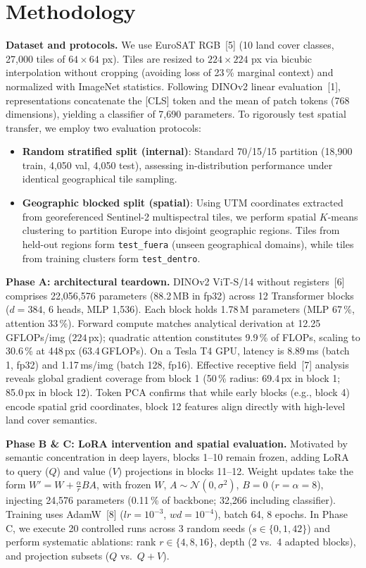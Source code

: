 \documentclass[10pt,a4paper]{article}
\newcommand{\para}[1]{\textbf{#1}\enspace}
\begin{document}
\section{Methodology}
\para{Dataset and protocols.} We use EuroSAT RGB~[5] (10 land cover classes, 27,000 tiles of $64\times64$ px). Tiles are resized to $224\times224$ px via bicubic interpolation without cropping (avoiding loss of 23\,\% marginal context) and normalized with ImageNet statistics. Following DINOv2 linear evaluation~[1], representations concatenate the [CLS] token and the mean of patch tokens (768 dimensions), yielding a classifier of 7,690 parameters.
To rigorously test spatial transfer, we employ two evaluation protocols:
\begin{itemize}\setlength{\itemsep}{0pt}\setlength{\parskip}{0pt}\setlength{\leftskip}{-1.2em}
\item \textbf{Random stratified split (internal)}: Standard 70/15/15 partition (18,900 train, 4,050 val, 4,050 test), assessing in-distribution performance under identical geographical tile sampling.
\item \textbf{Geographic blocked split (spatial)}: Using UTM coordinates extracted from georeferenced Sentinel-2 multispectral tiles, we perform spatial $K$-means clustering to partition Europe into disjoint geographic regions. Tiles from held-out regions form \texttt{test\_fuera} (unseen geographical domains), while tiles from training clusters form \texttt{test\_dentro}.
\end{itemize}

\para{Phase A: architectural teardown.} DINOv2 ViT-S/14 without registers~[6] comprises 22,056,576 parameters (88.2\,MB in fp32) across 12 Transformer blocks ($d=384$, 6 heads, MLP 1,536). Each block holds 1.78\,M parameters (MLP 67\,\%, attention 33\,\%). Forward compute matches analytical derivation at 12.25\,GFLOPs/img ($224$\,px); quadratic attention constitutes 9.9\,\% of FLOPs, scaling to 30.6\,\% at 448\,px (63.4\,GFLOPs). On a Tesla T4 GPU, latency is 8.89\,ms (batch 1, fp32) and 1.17\,ms/img (batch 128, fp16). Effective receptive field~[7] analysis reveals global gradient coverage from block 1 (50\,\% radius: 69.4\,px in block 1; 85.0\,px in block 12). Token PCA confirms that while early blocks (e.g., block 4) encode spatial grid coordinates, block 12 features align directly with high-level land cover semantics.

\para{Phase B \& C: LoRA intervention and spatial evaluation.} Motivated by semantic concentration in deep layers, blocks 1--10 remain frozen, adding LoRA to query ($Q$) and value ($V$) projections in blocks 11--12. Weight updates take the form $W' = W + \frac{\alpha}{r} BA$, with frozen $W$, $A \sim \mathcal{N}(0, \sigma^2)$, $B=0$ ($r=\alpha=8$), injecting 24,576 parameters (0.11\,\% of backbone; 32,266 including classifier). Training uses AdamW~[8] ($lr=10^{-3}$, $wd=10^{-4}$), batch 64, 8 epochs. In Phase C, we execute 20 controlled runs across 3 random seeds ($s \in \{0, 1, 42\}$) and perform systematic ablations: rank $r \in \{4, 8, 16\}$, depth (2 vs.\ 4 adapted blocks), and projection subsets ($Q$ vs.\ $Q+V$).
\end{document}
